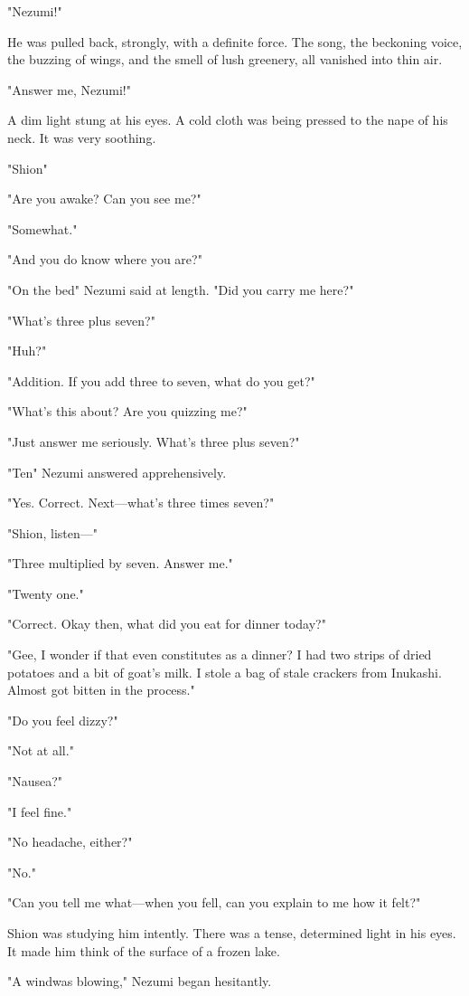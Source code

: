 "Nezumi!"

He was pulled back, strongly, with a definite force. The song, the
beckoning voice, the buzzing of wings, and the smell of lush greenery,
all vanished into thin air.

"Answer me, Nezumi!"

A dim light stung at his eyes. A cold cloth was being pressed to the
nape of his neck. It was very soothing.

"Shion\el "

"Are you awake? Can you see me?"

"Somewhat."

"And you do know where you are?"

"On the bed\el " Nezumi said at length. "Did you carry me here?"

"What's three plus seven?"

"Huh?"

"Addition. If you add three to seven, what do you get?"

"What's this about? Are you quizzing me?"

"Just answer me seriously. What's three plus seven?"

"Ten\el " Nezumi answered apprehensively.

"Yes. Correct. Next---what's three times seven?"

"Shion, listen---"

"Three multiplied by seven. Answer me."

"Twenty one."

"Correct. Okay then, what did you eat for dinner today?"

"Gee, I wonder if that even constitutes as a dinner? I had two strips of
dried potatoes and a bit of goat's milk. I stole a bag of stale crackers
from Inukashi. Almost got bitten in the process."

"Do you feel dizzy?"

"Not at all."

"Nausea?"

"I feel fine."

"No headache, either?"

"No."

"Can you tell me what---when you fell, can you explain to me how it felt?"

Shion was studying him intently. There was a tense, determined light in
his eyes. It made him think of the surface of a frozen lake.

"A wind\el was blowing," Nezumi began hesitantly.

